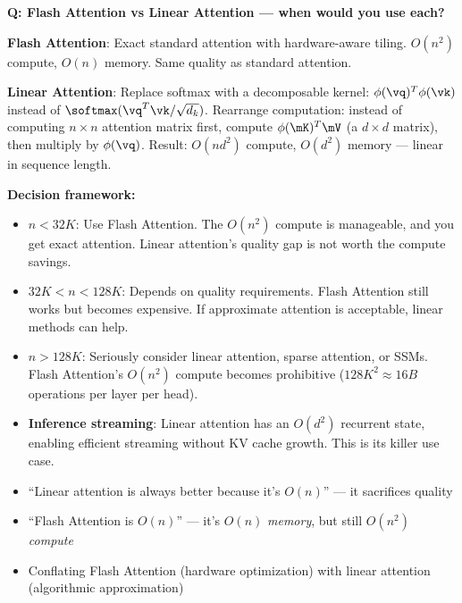 \begin{interviewq}
\textbf{Q: Flash Attention vs Linear Attention --- when would you use each?}

 \quad {} \quad \badgefreq{\freqmed}

\stronganswer

\textbf{Flash Attention}: Exact standard attention with hardware-aware tiling. $O(n^2)$ compute, $O(n)$ memory. Same quality as standard attention.

\textbf{Linear Attention}: Replace softmax with a decomposable kernel: $\phi(\vq)^T\phi(\vk)$ instead of $\softmax(\vq^T\vk/\sqrt{d_k})$. Rearrange computation: instead of computing $n \times n$ attention matrix first, compute $\phi(\mK)^T\mV$ (a $d \times d$ matrix), then multiply by $\phi(\vq)$. Result: $O(nd^2)$ compute, $O(d^2)$ memory --- linear in sequence length.

\textbf{Decision framework:}
\begin{itemize}
    \item \textbf{$n < 32K$}: Use Flash Attention. The $O(n^2)$ compute is manageable, and you get exact attention. Linear attention's quality gap is not worth the compute savings.
    \item \textbf{$32K < n < 128K$}: Depends on quality requirements. Flash Attention still works but becomes expensive. If approximate attention is acceptable, linear methods can help.
    \item \textbf{$n > 128K$}: Seriously consider linear attention, sparse attention, or SSMs. Flash Attention's $O(n^2)$ compute becomes prohibitive ($128K^2 \approx 16B$ operations per layer per head).
    \item \textbf{Inference streaming}: Linear attention has an $O(d^2)$ recurrent state, enabling efficient streaming without KV cache growth. This is its killer use case.
\end{itemize}

\redflags
\begin{itemize}
    \item ``Linear attention is always better because it's $O(n)$'' --- it sacrifices quality
    \item ``Flash Attention is $O(n)$'' --- it's $O(n)$ \textit{memory}, but still $O(n^2)$ \textit{compute}
    \item Conflating Flash Attention (hardware optimization) with linear attention (algorithmic approximation)
\end{itemize}


\end{interviewq}
